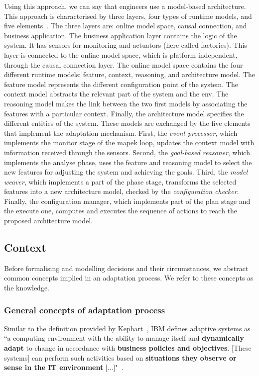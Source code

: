 Using this approach, we can say that engineers use a model-based architecture.
This approach is characterised by three layers, four types of runtime models, and five elements~\cite{DBLP:journals/computer/MorinBJFS09}.
The three layers are: online model space, causal connection, and business application.
The business application layer contains the logic of the system.
It has sensors for monitoring and actuators (here called factories).
This layer is connected to the online model space, which is platform independent, through the causal connection layer.
The online model space contains the four different runtime models: feature, context, reasoning, and architecture model.
The feature model represents the different configuration point of the system.
The context model abstracts the relevant part of the system and the \gls{env}.
The reasoning model makes the link between the two first models by associating the features with a particular context.
Finally, the architecture model specifies the different entities of the system.
These models are exchanged by the five elements that implement the adaptation mechanism.
First, the \textit{event processor}, which implements the monitor stage of the \gls{mapek} loop, updates the context model with information received through the sensors.
Second, the \textit{goal-based reasoner}, which implements the analyse phase, uses the feature and reasoning model to select the new features for adjusting the system and achieving the goals.
Third, the \textit{model weaver}, which implements a part of the phase stage, transforms the selected features into a new architecture model, checked by the \textit{configuration checker}.
Finally, the configuration manager, which implements part of the plan stage and the execute one, computes and executes the sequence of actions to reach the proposed architecture model.

\subsection{Context}
Before formalising and modelling decisions and their circumstances, we abstract common concepts implied in an adaptation process. We refer to these concepts as the knowledge.

\subsubsection{General concepts of adaptation process}

Similar to the definition provided by Kephart~\cite{DBLP:journals/computer/KephartC03}, IBM  defines adaptive systems as ``a computing environment with the ability to manage itself and \textbf{dynamically adapt} to change in accordance with \textbf{business policies and objectives}. [These systems] can perform such activities based on \textbf{situations they observe or sense in the IT environment} [...]"~\cite{computing2006architectural}.

